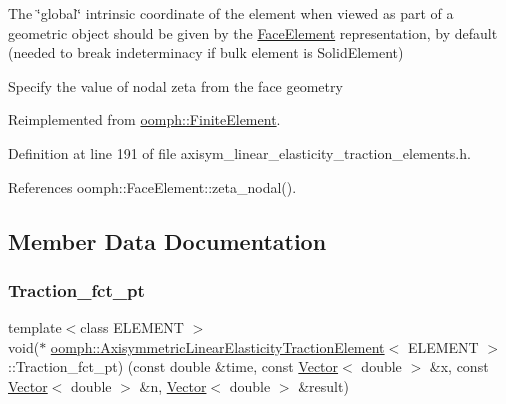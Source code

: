 The \char`\"{}global\char`\"{} intrinsic coordinate of the element when viewed as part of a geometric object should be given by the \hyperlink{classoomph_1_1FaceElement}{Face\+Element} representation, by default (needed to break indeterminacy if bulk element is Solid\+Element) 

Specify the value of nodal zeta from the face geometry 

Reimplemented from \hyperlink{classoomph_1_1FiniteElement_a849561c5fbcbc07dc49d2dc6cca68559}{oomph\+::\+Finite\+Element}.



Definition at line 191 of file axisym\+\_\+linear\+\_\+elasticity\+\_\+traction\+\_\+elements.\+h.



References oomph\+::\+Face\+Element\+::zeta\+\_\+nodal().



\subsection{Member Data Documentation}
\mbox{\label{classoomph_1_1AxisymmetricLinearElasticityTractionElement_a4e8f5cdb73984c400c4297a0f963a520}} 
\subsubsection{\texorpdfstring{Traction\+\_\+fct\+\_\+pt}{Traction\_fct\_pt}}
{\footnotesize\ttfamily template$<$class E\+L\+E\+M\+E\+NT $>$ \\
void($\ast$ \hyperlink{classoomph_1_1AxisymmetricLinearElasticityTractionElement}{oomph\+::\+Axisymmetric\+Linear\+Elasticity\+Traction\+Element}$<$ E\+L\+E\+M\+E\+NT $>$\+::Traction\+\_\+fct\+\_\+pt) (const double \&time, const \hyperlink{classoomph_1_1Vector}{Vector}$<$ double $>$ \&x, const \hyperlink{classoomph_1_1Vector}{Vector}$<$ double $>$ \&n, \hyperlink{classoomph_1_1Vector}{Vector}$<$ double $>$ \&result)\hspace{0.3cm}{\ttfamily [protected]}}



